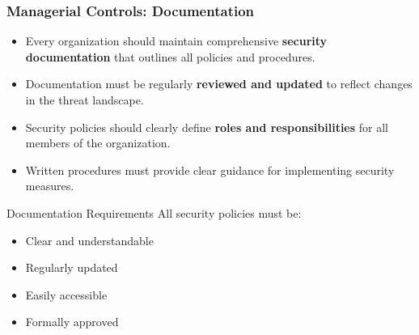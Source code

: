 \documentclass{beamer}
\begin{document}
\begin{frame}
    \frametitle{Managerial Controls: Documentation}
    
    \begin{itemize}
        \item Every organization should maintain comprehensive \textbf{security documentation} that outlines all policies and procedures.
        
        \item Documentation must be regularly \textbf{reviewed and updated} to reflect changes in the threat landscape.
        
        \item Security policies should clearly define \textbf{roles and responsibilities} for all members of the organization.
        
        \item Written procedures must provide clear guidance for implementing security measures.
    \end{itemize}
    
    \begin{alertblock}{Documentation Requirements}
        All security policies must be:
        \begin{itemize}
            \item Clear and understandable
            \item Regularly updated
            \item Easily accessible
            \item Formally approved
        \end{itemize}
    \end{alertblock}
\end{frame}
\end{document}
